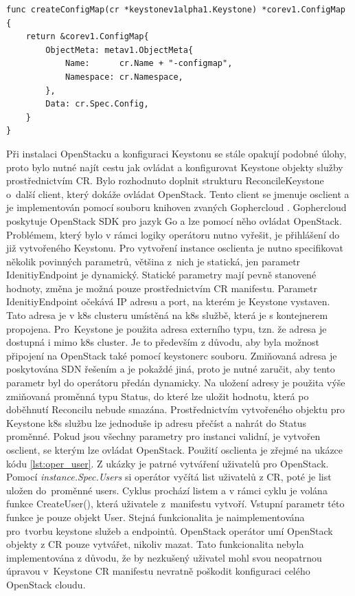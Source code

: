 \begin{lstlisting}[caption={Ukázka fuknce pro generováni ConfigMap, zdroj: vlastní tvorba},label={lst:configmap}]
func createConfigMap(cr *keystonev1alpha1.Keystone) *corev1.ConfigMap {
	return &corev1.ConfigMap{
		ObjectMeta: metav1.ObjectMeta{
			Name:      cr.Name + "-configmap",
			Namespace: cr.Namespace,
		},
		Data: cr.Spec.Config,
	}
}
\end{lstlisting}

Při instalaci OpenStacku a konfiguraci Keystonu se stále opakují podobné úlohy, proto bylo nutné najít cestu jak ovládat a konfigurovat Keystone objekty služby prostřednictvím CR. Bylo rozhodnuto doplnit strukturu ReconcileKeystone o další client, který dokáže ovládat OpenStack. Tento client se jmenuje osclient a je implementován pomocí souboru knihoven zvaných Gophercloud \cite{gophercloud}. Gophercloud poskytuje OpenStack SDK pro jazyk Go a lze pomocí něho ovládat OpenStack. Problémem, který bylo v rámci logiky operátoru nutno vyřešit, je přihlášení do již vytvořeného Keystonu. Pro vytvoření instance osclienta je nutno specifikovat několik povinných parametrů, většina z nich je statická, jen parametr IdenitiyEndpoint je dynamický. Statické parametry mají pevně stanovené hodnoty, změna je možná pouze prostřednictvím CR manifestu. Parametr IdenitiyEndpoint očekává IP adresu a port, na kterém je Keystone vystaven. Tato adresa je v k8s clusteru umístěná na k8s službě, která je s kontejnerem propojena. Pro Keystone je použita adresa externího typu, tzn. že adresa je dostupná i mimo k8s cluster. Je to především z důvodu, aby byla možnost připojení na OpenStack také pomocí keystonerc souboru. Zmiňovaná adresa je poskytována SDN řešením a je pokaždé jiná, proto je nutné zaručit, aby tento parametr byl do operátoru předán dynamicky. Na uložení adresy je použita výše zmiňovaná proměnná typu Status, do které lze uložit hodnotu, která po doběhnutí Reconcilu nebude smazána. Prostřednictvím vytvořeného objektu pro Keystone k8s službu lze jednoduše ip adresu přečíst a nahrát do Status proměnné. Pokud jsou všechny parametry pro instanci validní, je vytvořen osclient, se kterým lze ovládat OpenStack. Použití osclienta je zřejmé na ukázce kódu \ref{lst:oper_user}. Z ukázky je patrné vytváření uživatelů pro OpenStack. Pomocí \textit{instance.Spec.Users} si operátor vyčítá list uživatelů z CR, poté je list uložen do proměnné users. Cyklus prochází listem a v rámci cyklu je volána funkce CreateUser(), která uživatele z manifestu vytvoří. Vstupní parametr této funkce je pouze objekt User. Stejná funkcionalita je naimplementována pro tvorbu keystone služeb a endpointů. OpenStack operátor umí OpenStack objekty z CR pouze vytvářet, nikoliv mazat. Tato funkcionalita nebyla implementována z důvodu, že by nezkušený uživatel mohl svou neopatrnou úpravou v Keystone CR manifestu nevratně poškodit konfiguraci celého OpenStack cloudu. 

